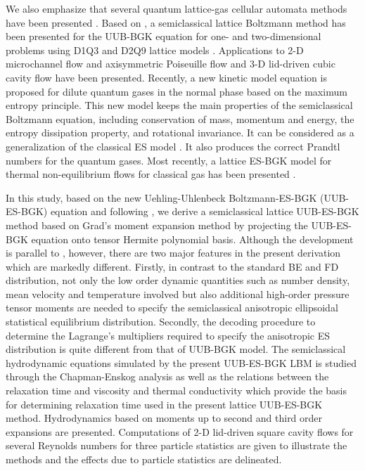 \documentclass[aip,jmp,amsmath,amssymb,reprint,noshowpacs]{revtex4-1}
\begin{document}
We also emphasize that several quantum lattice-gas cellular automata methods have been presented \cite{Meyer1996, Boghosian98, Yepez2001, Palpacelli}.
Based on \cite{Shan2006}, a semiclassical lattice Boltzmann method has been presented for the UUB-BGK equation for one- and two-dimensional problems using D1Q3 and D2Q9 lattice models \cite{Yang2009}.  Applications to 2-D microchannel flow and axisymmetric Poiseuille flow and 3-D lid-driven cubic cavity flow have been presented.  Recently, a new kinetic model equation is proposed \cite{Wu2012} for dilute quantum gases in the normal phase based on the maximum entropy principle. This new model keeps the main properties of the semiclassical Boltzmann equation, including conservation of mass, momentum and energy, the entropy dissipation property, and rotational invariance. It can be considered as a generalization of the classical ES model \cite{Holway1966}. It also produces the correct Prandtl numbers for the quantum gases.  Most recently, a lattice ES-BGK model for thermal non-equilibrium flows for classical gas has been presented \cite{Zhang2013}.

In this study, based on the new Uehling-Uhlenbeck Boltzmann-ES-BGK (UUB-ES-BGK) equation \cite{Wu2012} and following \cite{Yang2009}, we
derive a semiclassical lattice UUB-ES-BGK method based on Grad's moment expansion method by projecting the UUB-ES-BGK equation onto tensor Hermite polynomial basis.  Although the development is parallel to \cite{Yang2009}, however, there are two major features in the present derivation which are markedly different. Firstly, in contrast to the standard BE and FD distribution, not only the low order dynamic quantities such as number density, mean velocity and temperature involved but also additional high-order pressure tensor moments are needed to specify the semiclassical anisotropic ellipsoidal statistical equilibrium distribution.  Secondly, the decoding procedure to determine the Lagrange's multipliers required to specify the anisotropic ES distribution is quite different from that of UUB-BGK model.  The semiclassical hydrodynamic equations simulated by the present UUB-ES-BGK LBM is studied through the Chapman-Enskog analysis as well as the relations between the relaxation time and viscosity and thermal conductivity which provide the basis for determining relaxation time used in the present lattice UUB-ES-BGK method.  Hydrodynamics based on moments up to second and third order expansions are presented.   Computations of 2-D lid-driven square cavity flows for several Reynolds numbers for three particle statistics are given to illustrate the methods and the effects due to particle statistics are delineated.
\end{document}
